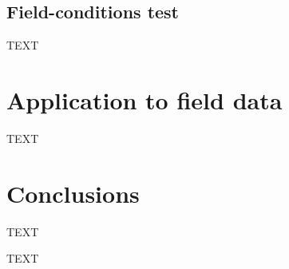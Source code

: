 \documentclass[journal abbreviation, npg]{copernicus}
\begin{document}
\subsection{Field-conditions test}
TEXT

\section{Application to field data}
TEXT

\section{Conclusions}
TEXT



\begin{acknowledgements}
TEXT
\end{acknowledgements}






\end{document}

